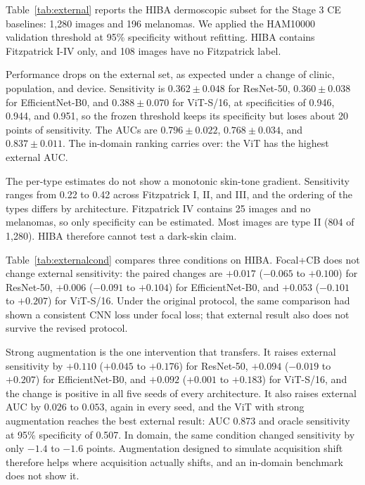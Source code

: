 Table~\ref{tab:external} reports the HIBA dermoscopic subset for the Stage 3 CE baselines: 1,280 images and 196 melanomas. We applied the HAM10000 validation threshold at 95\% specificity without refitting. HIBA contains Fitzpatrick I-IV only, and 108 images have no Fitzpatrick label.

Performance drops on the external set, as expected under a change of clinic, population, and device. Sensitivity is $0.362\pm0.048$ for ResNet-50, $0.360\pm0.038$ for EfficientNet-B0, and $0.388\pm0.070$ for ViT-S/16, at specificities of 0.946, 0.944, and 0.951, so the frozen threshold keeps its specificity but loses about 20 points of sensitivity. The AUCs are $0.796\pm0.022$, $0.768\pm0.034$, and $0.837\pm0.011$. The in-domain ranking carries over: the ViT has the highest external AUC.

The per-type estimates do not show a monotonic skin-tone gradient. Sensitivity ranges from 0.22 to 0.42 across Fitzpatrick I, II, and III, and the ordering of the types differs by architecture. Fitzpatrick IV contains 25 images and no melanomas, so only specificity can be estimated. Most images are type II (804 of 1,280). HIBA therefore cannot test a dark-skin claim.

Table~\ref{tab:externalcond} compares three conditions on HIBA. Focal+CB does not change external sensitivity: the paired changes are $+0.017$ ($-0.065$ to $+0.100$) for ResNet-50, $+0.006$ ($-0.091$ to $+0.104$) for EfficientNet-B0, and $+0.053$ ($-0.101$ to $+0.207$) for ViT-S/16. Under the original protocol, the same comparison had shown a consistent CNN loss under focal loss; that external result also does not survive the revised protocol.

Strong augmentation is the one intervention that transfers. It raises external sensitivity by $+0.110$ ($+0.045$ to $+0.176$) for ResNet-50, $+0.094$ ($-0.019$ to $+0.207$) for EfficientNet-B0, and $+0.092$ ($+0.001$ to $+0.183$) for ViT-S/16, and the change is positive in all five seeds of every architecture. It also raises external AUC by $0.026$ to $0.053$, again in every seed, and the ViT with strong augmentation reaches the best external result: AUC 0.873 and oracle sensitivity at 95\% specificity of 0.507. In domain, the same condition changed sensitivity by only $-1.4$ to $-1.6$ points. Augmentation designed to simulate acquisition shift therefore helps where acquisition actually shifts, and an in-domain benchmark does not show it.




